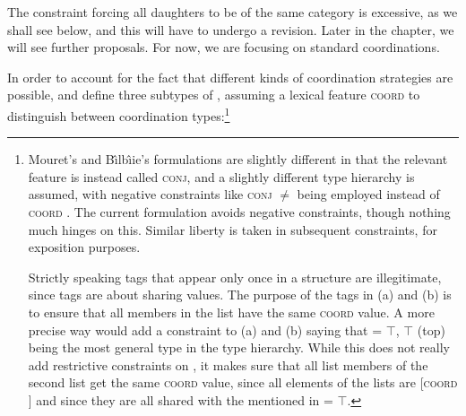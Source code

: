 \ea 
{}
\label{coordparam2}
\z

\largerpage
\noindent
The constraint forcing all daughters to be of the same category is excessive, as we shall see below,
and this will have to undergo a revision. Later in the chapter, we will see further proposals. For
now, we are focusing on standard coordinations. 

In order to  account for the fact that different kinds of coordination strategies are possible,
\citet[]{Mouret:06} and \citet[]{Bilbiie:17} define three subtypes of
, assuming a lexical feature \textsc{coord} to distinguish between   coordination
types:\footnote{Mouret's and Bı̂lbı̂ie's formulations are slightly different in that the relevant
  feature is instead called \textsc{conj}, and a slightly different type hierarchy is assumed, with
  negative constraints like  \textsc{conj} $\not=$  being employed instead of
  \textsc{coord} . The current formulation   avoids negative constraints, though nothing
  much hinges on this. Similar liberty is taken in subsequent constraints, for exposition purposes.

Strictly speaking tags that appear only once in a structure are illegitimate, since tags are about
sharing values. The purpose of the tags in (a) and (b) is to ensure that all members
in the list have the same \textsc{coord} value. A more precise way would add a constraint to
(a) and (b) saying that  = $\top$, $\top$ (top) being the most general type in the type
hierarchy. While this does not really add restrictive constraints on , it makes sure that
all list members of the second list get the same \textsc{coord} value, since all elements of the
lists are [\textsc{coord} ] and since they are all shared with the  mentioned in
 = $\top$.}
 

\eal
\ex
{}

\ex
{}\label{omni}
\ex
{}
\zl

